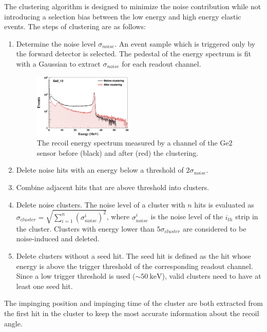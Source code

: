 \documentclass[number,5p]{elsarticle}
\begin{document}
The clustering algorithm is designed to minimize the noise contribution while
not introducing a selection bias between the low energy and high energy elastic events.
The steps of clustering are as follows:
\begin{enumerate}
\item Determine the noise level $\sigma_{noise}$. An event sample which is
  triggered only by the forward detector is selected.
  The pedestal of the energy spectrum is fit with a Gaussian to extract $\sigma_{noise}$ for each
  readout channel.
  \begin{figure}[b]
    \centering
    \includegraphics[width=0.45\textwidth]{./clustering.png}
    \caption{The recoil energy spectrum measured by a channel of the Ge2 sensor before (black) and after (red) the clustering.}
    \label{fig:clustering}
  \end{figure}
\item Delete noise hits with an energy below a threshold of $2\sigma_{noise}$.
\item Combine adjacent hits that are above threshold into clusters.
\item Delete noise clusters. The noise level of a cluster with $n$ hits is evaluated as
  $\sigma_{cluster} = \sqrt{\sum_{i=1}^n{(\sigma_{noise}^i)^2}}$, where $\sigma_{noise}^i$ is
  the noise level of the $i_{th}$ strip in the cluster. Clusters with energy lower than $5\sigma_{cluster}$ are considered to be noise-induced and deleted.
\item Delete clusters without a seed hit. The seed hit is defined as the
  hit whose energy is above the trigger threshold of the corresponding readout
  channel. Since a low trigger threshold is used ($\sim\SI{50}{\keV}$), valid clusters need to have at least one seed hit.
\end{enumerate}
The impinging position and impinging time of the cluster are both extracted from the first
hit in the cluster to keep the most accurate information about the recoil angle.
\end{document}
